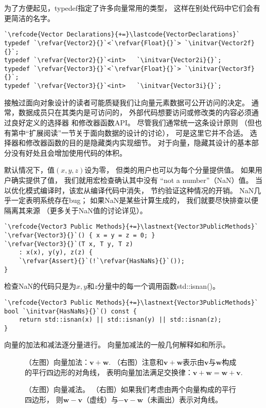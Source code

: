 为了方便起见，{\ttfamily typedef}指定了许多向量常用的类型，
这样在别处代码中它们会有更简洁的名字。
\begin{lstlisting}
`\refcode{Vector Declarations}{+=}\lastcode{VectorDeclarations}`
typedef `\refvar{Vector2}{}`<`\refvar{Float}{}`> `\initvar{Vector2f}{}`;
typedef `\refvar{Vector2}{}`<int>   `\initvar{Vector2i}{}`;
typedef `\refvar{Vector3}{}`<`\refvar{Float}{}`> `\initvar{Vector3f}{}`;
typedef `\refvar{Vector3}{}`<int>   `\initvar{Vector3i}{}`;
\end{lstlisting}

接触过面向对象设计的读者可能质疑我们让向量元素数据可公开访问的决定。
通常，数据成员只在其类内是可访问的，
外部代码想要访问或修改类的内容必须通过良好定义的选择器
和修改器函数API。
尽管我们通常统一这条设计原则
（但也有第中“扩展阅读”一节关于面向数据的设计的讨论），
可是这里它并不合适。
选择器和修改器函数的目的是隐藏类内实现细节。
对于向量，隐藏其设计的基本部分没有好处且会增加使用代码的体积。

默认情况下，值$(x,y,z)$设为零，
但类的用户也可以为每个分量提供值。
如果用户确实提供了值，
我们就用宏检查确认其中没有
“not a number”（NaN）值。
当以优化模式编译时，该宏从编译代码中消失，
节约验证这种情况的开销。
NaN几乎一定表明系统存在bug；
如果NaN是某些计算生成的，
我们就要尽快排查以便隔离其来源
（更多关于NaN值的讨论详见）。
\begin{lstlisting}
`\refcode{Vector3 Public Methods}{+=}\lastnext{Vector3PublicMethods}`
`\refvar{Vector3}{}`() { x = y = z = 0; }
`\refvar{Vector3}{}`(T x, T y, T z)
    : x(x), y(y), z(z) {
    `\refvar{Assert}{}`(!`\refvar{HasNaNs}{}`());
}
\end{lstlisting}

检查NaN的代码只是为$x,y$和$z$分量中的每一个调用函数{\ttfamily std::isnan()}。
\begin{lstlisting}
`\refcode{Vector3 Public Methods}{+=}\lastnext{Vector3PublicMethods}`
bool `\initvar{HasNaNs}{}`() const {
    return std::isnan(x) || std::isnan(y) || std::isnan(z);
}
\end{lstlisting}

向量的加法和减法逐分量进行。
向量加减法的一般几何解释如和所示。
\begin{figure}[htbp]
    \centering
    \caption{（左图）向量加法：$\bm v+\bm w$.
        （右图）注意和$\bm v+\bm w$表示由$\bm v$与$\bm w$构成的平行四边形的对角线，
        表明向量加法满足交换律：$\bm v+\bm w=\bm w+\bm v$.}
    \label{fig:2.3}
\end{figure}
\begin{figure}[htbp]
    \centering
    \caption{（左图）向量减法。
        （右图）如果我们考虑由两个向量构成的平行四边形，
        则$\bm w-\bm v$（虚线）与$-\bm v-\bm w$（未画出）表示对角线。}
    \label{fig:2.4}
\end{figure}

